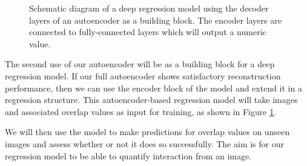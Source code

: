 \begin{figure}[h!]
    \centering
    \caption{Schematic diagram of a deep regression model using the decoder layers of an autoencoder as a building block. The encoder layers are connected to fully-connected layers which will output a numeric value.}
    \label{fig:regression}
\end{figure}

The second use of our autoencoder will be as a building block for a deep regression model. If our full autoencoder shows satisfactory reconstruction performance, then we can use the encoder block of the model and extend it in a regression structure. This autoencoder-based regression model will take images and associated overlap values as input for training, as shown in Figure \ref{fig:regression}.

We will then use the model to make predictions for overlap values on unseen images and assess whether or not it does so successfully. The aim is for our regression model to be able to quantify interaction from an image.
